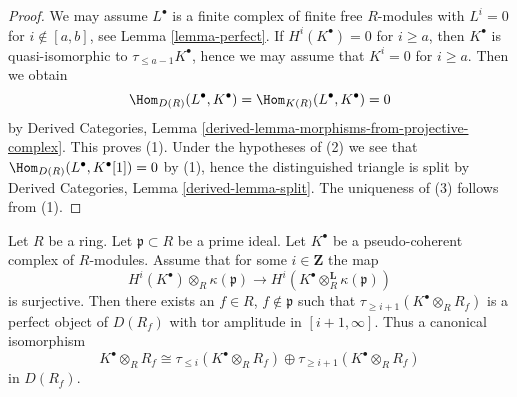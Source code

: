 \begin{proof}
We may assume $L^\bullet$ is a finite complex of finite free $R$-modules
with $L^i = 0$ for $i \not \in [a, b]$, see Lemma \ref{lemma-perfect}.
If $H^i(K^\bullet) = 0$ for $i \geq a$, then $K^\bullet$ is quasi-isomorphic
to $\tau_{\leq a - 1}K^\bullet$, hence we may assume that $K^i = 0$
for $i \geq a$. Then we obtain
$$
\Hom_{D(R)}(L^\bullet, K^\bullet) =
\Hom_{K(R)}(L^\bullet, K^\bullet) = 0
$$
by Derived Categories, Lemma
\ref{derived-lemma-morphisms-from-projective-complex}.
This proves (1). Under the hypotheses of (2) we see that
$\Hom_{D(R)}(L^\bullet, K^\bullet[1]) = 0$ by (1), hence
the distinguished triangle is split by
Derived Categories, Lemma \ref{derived-lemma-split}.
The uniqueness of (3) follows from (1).
\end{proof}

\begin{lemma}
\label{lemma-better-cut-complex-in-two}
Let $R$ be a ring. Let $\mathfrak p \subset R$ be a prime ideal.
Let $K^\bullet$ be a pseudo-coherent complex of $R$-modules.
Assume that for some $i \in \mathbf{Z}$ the map
$$
H^i(K^\bullet) \otimes_R \kappa(\mathfrak p)
\longrightarrow
H^i(K^\bullet \otimes_R^{\mathbf{L}} \kappa(\mathfrak p))
$$
is surjective. Then there exists an $f \in R$, $f \not \in \mathfrak p$
such that $\tau_{\geq i + 1}(K^\bullet \otimes_R R_f)$ is a perfect
object of $D(R_f)$ with tor amplitude in $[i + 1, \infty]$. Thus
a canonical isomorphism
$$
K^\bullet \otimes_R R_f \cong
\tau_{\leq i}(K^\bullet \otimes_R R_f) \oplus
\tau_{\geq i + 1}(K^\bullet \otimes_R R_f)
$$
in $D(R_f)$.
\end{lemma}

